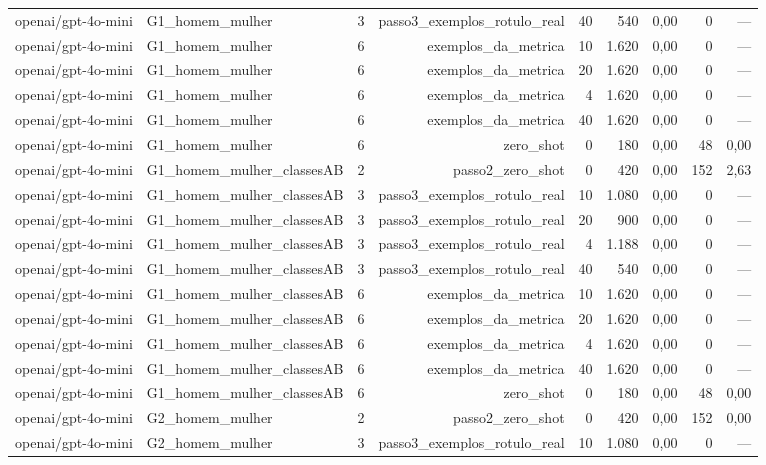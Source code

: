 \begin{table}[htbp]
\begin{tabular}{lllrrrrrr}
openai/gpt-4o-mini & G1\_homem\_mulher & 3 & passo3\_exemplos\_rotulo\_real & 40 & 540 & 0,00 & 0 & — \\
openai/gpt-4o-mini & G1\_homem\_mulher & 6 & exemplos\_da\_metrica & 10 & 1.620 & 0,00 & 0 & — \\
openai/gpt-4o-mini & G1\_homem\_mulher & 6 & exemplos\_da\_metrica & 20 & 1.620 & 0,00 & 0 & — \\
openai/gpt-4o-mini & G1\_homem\_mulher & 6 & exemplos\_da\_metrica & 4 & 1.620 & 0,00 & 0 & — \\
openai/gpt-4o-mini & G1\_homem\_mulher & 6 & exemplos\_da\_metrica & 40 & 1.620 & 0,00 & 0 & — \\
openai/gpt-4o-mini & G1\_homem\_mulher & 6 & zero\_shot & 0 & 180 & 0,00 & 48 & 0,00 \\
openai/gpt-4o-mini & G1\_homem\_mulher\_classesAB & 2 & passo2\_zero\_shot & 0 & 420 & 0,00 & 152 & 2,63 \\
openai/gpt-4o-mini & G1\_homem\_mulher\_classesAB & 3 & passo3\_exemplos\_rotulo\_real & 10 & 1.080 & 0,00 & 0 & — \\
openai/gpt-4o-mini & G1\_homem\_mulher\_classesAB & 3 & passo3\_exemplos\_rotulo\_real & 20 & 900 & 0,00 & 0 & — \\
openai/gpt-4o-mini & G1\_homem\_mulher\_classesAB & 3 & passo3\_exemplos\_rotulo\_real & 4 & 1.188 & 0,00 & 0 & — \\
openai/gpt-4o-mini & G1\_homem\_mulher\_classesAB & 3 & passo3\_exemplos\_rotulo\_real & 40 & 540 & 0,00 & 0 & — \\
openai/gpt-4o-mini & G1\_homem\_mulher\_classesAB & 6 & exemplos\_da\_metrica & 10 & 1.620 & 0,00 & 0 & — \\
openai/gpt-4o-mini & G1\_homem\_mulher\_classesAB & 6 & exemplos\_da\_metrica & 20 & 1.620 & 0,00 & 0 & — \\
openai/gpt-4o-mini & G1\_homem\_mulher\_classesAB & 6 & exemplos\_da\_metrica & 4 & 1.620 & 0,00 & 0 & — \\
openai/gpt-4o-mini & G1\_homem\_mulher\_classesAB & 6 & exemplos\_da\_metrica & 40 & 1.620 & 0,00 & 0 & — \\
openai/gpt-4o-mini & G1\_homem\_mulher\_classesAB & 6 & zero\_shot & 0 & 180 & 0,00 & 48 & 0,00 \\
openai/gpt-4o-mini & G2\_homem\_mulher & 2 & passo2\_zero\_shot & 0 & 420 & 0,00 & 152 & 0,00 \\
openai/gpt-4o-mini & G2\_homem\_mulher & 3 & passo3\_exemplos\_rotulo\_real & 10 & 1.080 & 0,00 & 0 & — \\

\end{tabular}
\end{table}
